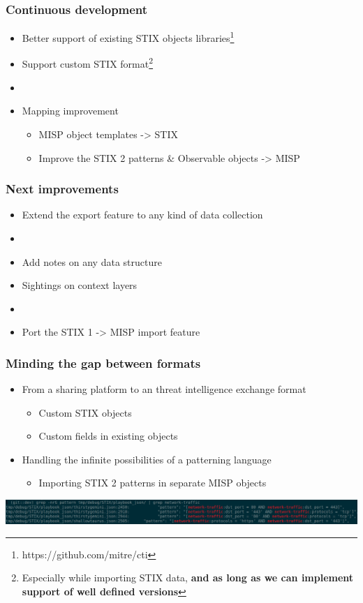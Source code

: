 \begin{frame}
    \frametitle{Continuous development}
    \begin{itemize}
        \item Better support of existing STIX objects libraries\footnote{https://github.com/mitre/cti}
        \item Support custom STIX format\footnote{Especially while importing STIX data, {\bf and as long as we can implement support of well defined versions}}
        \item []
        \item Mapping improvement
        \begin{itemize}
            \item MISP object templates -> STIX
            \item Improve the STIX 2 patterns \& Observable objects -> MISP
        \end{itemize}
    \end{itemize}
\end{frame}

\begin{frame}
    \frametitle{Next improvements}
    \begin{itemize}
        \item Extend the export feature to any kind of data collection
        \item []
        \item Add notes on any data structure
        \item Sightings on context layers
        \item []
        \item Port the STIX 1 -> MISP import feature
    \end{itemize}
\end{frame}

\begin{frame}
    \frametitle{Minding the gap between formats}
    \begin{itemize}
        \item From a sharing platform to an threat intelligence exchange format
        \begin{itemize}
            \item Custom STIX objects
            \item Custom fields in existing objects
        \end{itemize}
        \item Handling the infinite possibilities of a patterning language
        \begin{itemize}
            \item Importing STIX 2 patterns in separate MISP objects
        \end{itemize}
    \end{itemize}
    \pause
    \vspace{1em}
    \includegraphics[scale=0.15]{images/patterns.png}
\end{frame}


